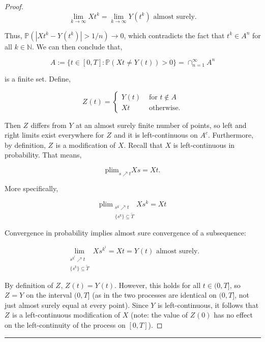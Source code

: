 \documentclass[12pt]{article}
\newcommand{\mb}{\mathbb}
\newcommand{\ra}{\rightarrow}
\newcommand{\te}{\text}
\newcommand{\lin}{\rule{\linewidth}{0.4 pt}}
\newcommand{\pr}{\mb{P}}							%
\newcommand{\T}{T}								%
\renewcommand{\t}{t}							%
\renewcommand{\tt}{s}							%
\newcommand{\X}{X}								%
\newcommand{\sln}[1]{^{#1}}						%
\renewcommand{\it}{k}								%
\newcommand{\itt}{i}								%
\newcommand{\rxvtt}[2]{Y_{#1}{(#2)}}				%
\newcommand{\rxvttt}[2]{Z_{#1}{(#2)}}				%
\newcommand{\rxvtts}[2]{Y_{#1}{#2}}					%
\newcommand{\rxvttts}[2]{Z_{#1}{#2}}				%
\newcommand{\alt}{\widetilde}						%
\newcommand{\typset}{A}							%
\begin{document}
\begin{proof}
\[\lim_{\it \ra\infty} \X{}{\t\sln{\it}} = \lim_{\it\ra\infty} \rxvtt{}{\t\sln{\it}} \te{ almost surely.}\]

Thus, \(\pr(|\X{}{\t\sln{\it}} - \rxvtt{}{\t\sln{\it}}| > 1/n) \ra 0\), which contradicts the fact that \(\t\sln{\it} \in \typset\sln{n}\) for all \(\it\in\mb{N}\). We can then conclude that,

\[\typset:= \{\t\in [0,\T]: \pr(\X{}{\t} \neq \rxvtt{}{\t}) > 0\} = \cap_{n = 1}^\infty \typset\sln{n}\]

is a finite set. Define,

\[\rxvttt{}{\t}= \begin{cases}
\rxvtt{}{\t} &\te{ for } \t \notin \typset\\
\X{}{\t} &\te{ otherwise.}
\end{cases}\]

Then \(\rxvttts{}{}\) differs from \(\rxvtts{}{}\) at an almost surely finite number of points, so left and right limits exist everywhere for \(\rxvttts{}{}\) and it is left-continuous on \(\typset^c\). Furthermore, by definition, \(\rxvttts{}{}\) is a modification of \(\X{}{}\). Recall that \(\X{}{}\) is left-continuous in probability. That means,

\[\te{plim}_{\tt\nearrow \t} \X{}{\tt} = \X{}{\t}.\]

More specifically,

\[\te{plim}_{\substack{\tt\sln{\it}\nearrow \t\\\{\tt\sln{\it}\} \subseteq \alt{T}}} \X{}{\tt\sln{\it}} = \X{}{\t}\]

Convergence in probability implies almost sure convergence of a subsequence:

\[\lim_{\substack{\tt\sln{\it\sln{\itt}} \nearrow \t\\\{\tt\sln{\it}\}\subseteq \alt{T}}} \X{}{\tt\sln{\it\sln{\itt}}} = \X{}{\t} = \rxvtt{}{\t} \te{ almost surely.}\]

By definition of \(\rxvttts{}{}\), \(\rxvttt{}{\t} = \rxvtt{}{\t}\). However, this holds for all \(\t \in (0,\T]\), so \(\rxvttts{}{} = \rxvtts{}{}\) on the interval \((0,\T]\) (as in the two processes are identical on \((0,\T]\), not just almost surely equal at every point). Since \(\rxvtts{}{}\) is left-continuous, it follows that \(\rxvttts{}{}\) is a left-continuous modification of \(\X{}{}\) (note: the value of \(\rxvttt{}{0}\) has no effect on the left-continuity of the process on \([0,\T]\)).
\end{proof}

\lin
\end{document}
